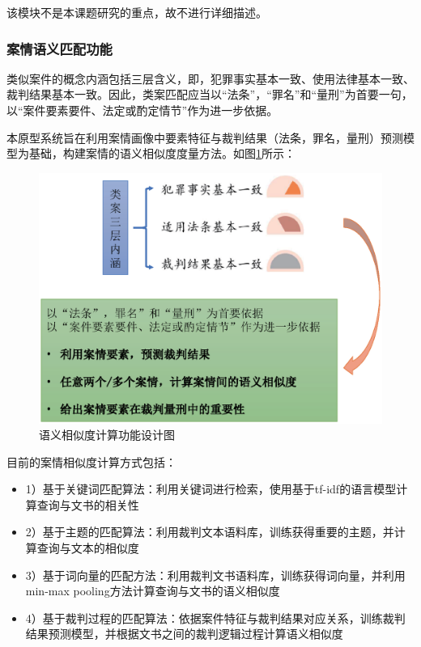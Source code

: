 该模块不是本课题研究的重点，故不进行详细描述。

\subsubsection{案情语义匹配功能}
\label{sec:sys_content}
类似案件的概念内涵包括三层含义，即，犯罪事实基本一致、使用法律基本一致、裁判结果基本一致。因此，类案匹配应当以“法条”，“罪名”和“量刑”为首要一句，以“案件要素要件、法定或酌定情节”作为进一步依据。

本原型系统旨在利用案情画像中要素特征与裁判结果（法条，罪名，量刑）预测模型为基础，构建案情的语义相似度度量方法。如图\ref{fig:sys_similarity}所示：
\begin{figure}[htbp]%
    \centering
    \includegraphics[scale=0.5, clip=true]{./sources/sys_similarity.eps}
    \caption{\label{fig:sys_similarity}语义相似度计算功能设计图}
\end{figure}

目前的案情相似度计算方式包括：
\begin{itemize}
    \item 1）基于关键词匹配算法：利用关键词进行检索，使用基于tf-idf的语言模型计算查询与文书的相关性
    \item 2）基于主题的匹配算法：利用裁判文本语料库，训练获得重要的主题，并计算查询与文本的相似度
    \item 3）基于词向量的匹配方法：利用裁判文书语料库，训练获得词向量，并利用min-max pooling方法计算查询与文书的语义相似度
    \item 4）基于裁判过程的匹配算法：依据案件特征与裁判结果对应关系，训练裁判结果预测模型，并根据文书之间的裁判逻辑过程计算语义相似度
\end{itemize}

